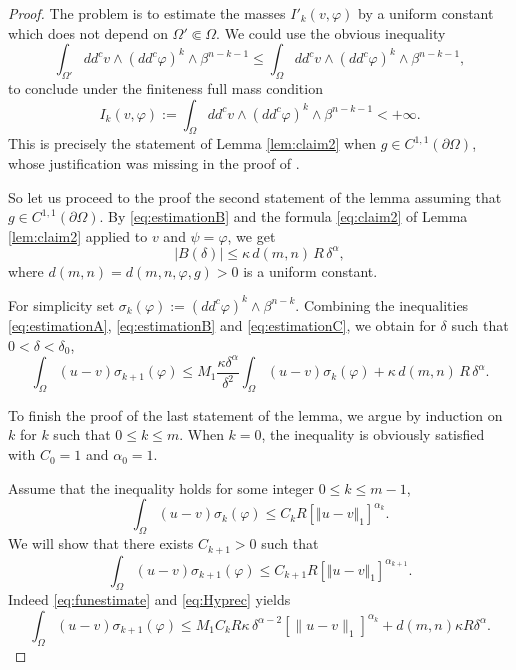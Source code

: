 \documentclass[JEP,XML,SOM,Unicode]{cedram}
\theoremstyle{definition}
\begin{document}
\begin{proof}
The problem is to estimate the masses $I'_k (v,\varphi) $ by a uniform constant which does not depend on $\Omega' \Subset \Omega$.
We could use the obvious inequality
\[
\int_{\Omega'} dd^c v \wedge(dd^c\varphi)^k\wedge\beta^{n-k-1} \leq \int_{\Omega} dd^c v \wedge(dd^c\varphi)^k\wedge\beta^{n-k-1},
\]
to conclude under the finiteness full mass condition
\[ I_k (v,\varphi) := \int_{\Omega} dd^c v \wedge(dd^c\varphi)^k\wedge\beta^{n-k-1}< + \infty.\]
This is precisely the statement of Lemma \ref{lem:claim2} when $g \in C^{1,1} (\partial \Omega)$, whose justification was missing in the proof of \cite[Lem.\,4.2]{BZ20}.

So let us proceed to the proof the second statement of the lemma assuming that $g \in C^{1,1} (\partial \Omega)$.
By \eqref{eq:estimationB} and the formula \eqref{eq:claim2} of Lemma \ref{lem:claim2} applied to $v$ and $\psi = \varphi$, we get
\begin{equation} \label{eq:estimationC}
|B (\delta)| \leq \kappa \, d(m,n) \, R \, \delta^{\alpha},
\end{equation}
where $d(m,n) = d(m,n,\varphi,g) >0$ is a uniform constant.

For simplicity set $ \sigma_{k }(\varphi) := (dd^c \varphi)^k \wedge \beta^{n - k}.$ Combining the inequalities \eqref{eq:estimationA}, \eqref{eq:estimationB} and \eqref{eq:estimationC}, we obtain for $\delta$ such that $0 < \delta < \delta_0$,
\begin{equation} \label{eq:funestimate}
\int_{\Omega}(u-v) \sigma_{k +1}(\varphi)\leq M_1 \frac{\kappa \delta^\alpha}{\delta^2} \int_{\Omega} (u-v) \sigma_{k }(\varphi) + \kappa \, d(m,n) \, R \, \delta^{\alpha}.
\end{equation}

To finish the proof of the last statement of the lemma, we argue by induction on~$k$ for $k$ such that $0 \leq k \leq m$.
When $k=0$, the inequality is obviously satisfied with $C_0 = 1$ and $\alpha_0 = 1$.

Assume that the inequality holds for some integer $0 \leq k\leq m - 1$, \ie
\begin{equation}\label{eq:Hyprec}
\int_{\Omega}( u-v) \sigma_k{(\varphi)}\leq C_{k} R[\Vert u-v \Vert_1]^{\alpha_k}.
\end{equation}
We will show that there exists $C_{k+1} > 0$ such that
\[
\int_{\Omega}(u-v) \sigma_{k+1}(\varphi)\leq C_{k+1} R[\Vert u-v \Vert_1]^{\alpha_{k+1}}.
\]
Indeed \eqref{eq:funestimate} and \eqref{eq:Hyprec} yields
\[
\int_{\Omega}(u-v) \sigma_{k+1}(\varphi)\leq
M_1 C_k R \kappa \, \delta^{\alpha - 2} [\|u-v\|_1]^{\alpha_k} + d(m,n) \kappa R \delta^{\alpha}.
\]


\end{proof}
\end{document}

